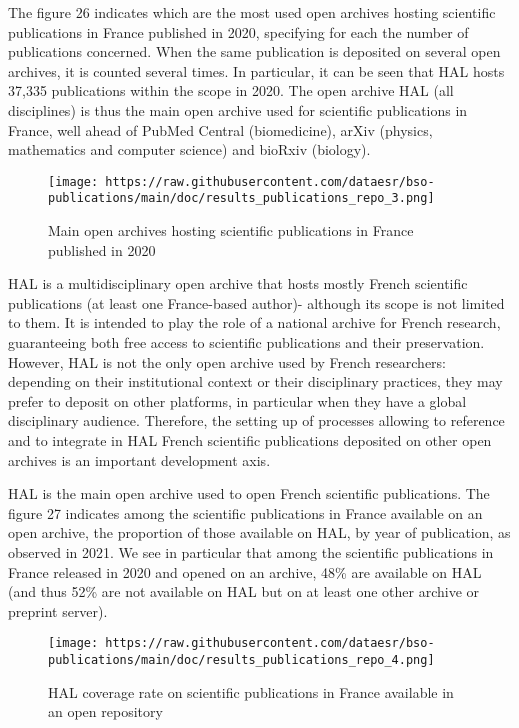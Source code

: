 \documentclass[
]{article}
\begin{document}
The figure 26 indicates which are the most used open archives hosting
scientific publications in France published in 2020, specifying for each
the number of publications concerned. When the same publication is
deposited on several open archives, it is counted several times. In
particular, it can be seen that HAL hosts 37,335 publications within the
scope in 2020. The open archive HAL (all disciplines) is thus the main
open archive used for scientific publications in France, well ahead of
PubMed Central (biomedicine), arXiv (physics, mathematics and computer
science) and bioRxiv (biology).

\begin{figure}
\centering
\texttt{[image: https://raw.githubusercontent.com/dataesr/bso-publications/main/doc/results\_publications\_repo\_3.png]}
\caption{Main open archives hosting scientific publications in France
published in 2020}
\end{figure}

HAL is a multidisciplinary open archive that hosts mostly French
scientific publications (at least one France-based author)- although its
scope is not limited to them. It is intended to play the role of a
national archive for French research, guaranteeing both free access to
scientific publications and their preservation. However, HAL is not the
only open archive used by French researchers: depending on their
institutional context or their disciplinary practices, they may prefer
to deposit on other platforms, in particular when they have a global
disciplinary audience. Therefore, the setting up of processes allowing
to reference and to integrate in HAL French scientific publications
deposited on other open archives is an important development axis.

HAL is the main open archive used to open French scientific
publications. The figure 27 indicates among the scientific publications
in France available on an open archive, the proportion of those
available on HAL, by year of publication, as observed in 2021. We see in
particular that among the scientific publications in France released in
2020 and opened on an archive, 48\% are available on HAL (and thus 52\%
are not available on HAL but on at least one other archive or preprint
server).

\begin{figure}
\centering
\texttt{[image: https://raw.githubusercontent.com/dataesr/bso-publications/main/doc/results\_publications\_repo\_4.png]}
\caption{HAL coverage rate on scientific publications in France
available in an open repository}
\end{figure}
\end{document}

